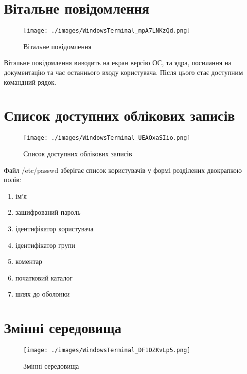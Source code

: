 \section{Вітальне повідомлення}
\label{sec:motd}

\begin{figure}[!ht]
    \centering
    \texttt{[image: ./images/WindowsTerminal\_mpA7LNKzQd.png]}
    \caption{Вітальне повідомлення}
    \label{fig:motd}
\end{figure}

Вітальне повідомлення виводить на екран версію ОС, та ядра,
посилання на документацію та час останнього входу користувача.
Після цього стає доступним командний рядок.

\section{Список доступних облікових записів}
\label{sec:passwd}

\begin{figure}[!ht]
    \centering
    \texttt{[image: ./images/WindowsTerminal\_UEAOxaSIio.png]}
    \caption{Список доступних облікових записів}
    \label{fig:passwd}
\end{figure}

Файл /etc/passwd зберігає список користувачів у формі розділених двокрапкою полів:
\begin{enumerate}
    \item ім'я
    \item зашифрований пароль
    \item ідентифікатор користувача
    \item ідентифікатор групи
    \item коментар
    \item початковий каталог
    \item шлях до оболонки
\end{enumerate}

\section{Змінні середовища}
\label{sec:env}

\begin{figure}[!ht]
    \centering
    \texttt{[image: ./images/WindowsTerminal\_DF1DZKvLp5.png]}
    \caption{Змінні середовища}
    \label{fig:env}
\end{figure}

